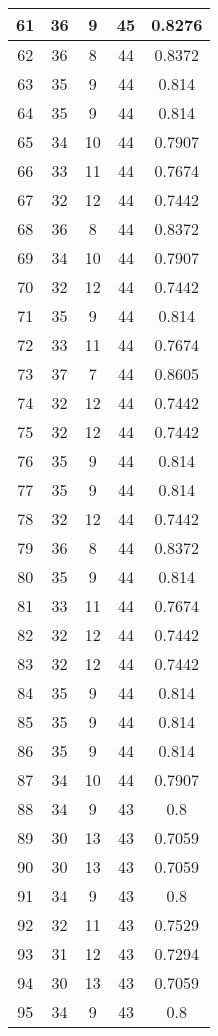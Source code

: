 \documentclass[letterpaper, 12pt]{article}
\begin{document}
\begin{longtable}{|c|c|c|c|c|}
\hline
61 & 36 & 9 & 45 & 0.8276 \\
\hline
62 & 36 & 8 & 44 & 0.8372 \\
\hline
63 & 35 & 9 & 44 & 0.814 \\
\hline
64 & 35 & 9 & 44 & 0.814 \\
\hline
65 & 34 & 10 & 44 & 0.7907 \\
\hline
66 & 33 & 11 & 44 & 0.7674 \\
\hline
67 & 32 & 12 & 44 & 0.7442 \\
\hline
68 & 36 & 8 & 44 & 0.8372 \\
\hline
69 & 34 & 10 & 44 & 0.7907 \\
\hline
70 & 32 & 12 & 44 & 0.7442 \\
\hline
71 & 35 & 9 & 44 & 0.814 \\
\hline
72 & 33 & 11 & 44 & 0.7674 \\
\hline
73 & 37 & 7 & 44 & 0.8605 \\
\hline
74 & 32 & 12 & 44 & 0.7442 \\
\hline
75 & 32 & 12 & 44 & 0.7442 \\
\hline
76 & 35 & 9 & 44 & 0.814 \\
\hline
77 & 35 & 9 & 44 & 0.814 \\
\hline
78 & 32 & 12 & 44 & 0.7442 \\
\hline
79 & 36 & 8 & 44 & 0.8372 \\
\hline
80 & 35 & 9 & 44 & 0.814 \\
\hline
81 & 33 & 11 & 44 & 0.7674 \\
\hline
82 & 32 & 12 & 44 & 0.7442 \\
\hline
83 & 32 & 12 & 44 & 0.7442 \\
\hline
84 & 35 & 9 & 44 & 0.814 \\
\hline
85 & 35 & 9 & 44 & 0.814 \\
\hline
86 & 35 & 9 & 44 & 0.814 \\
\hline
87 & 34 & 10 & 44 & 0.7907 \\
\hline
88 & 34 & 9 & 43 & 0.8 \\
\hline
89 & 30 & 13 & 43 & 0.7059 \\
\hline
90 & 30 & 13 & 43 & 0.7059 \\
\hline
91 & 34 & 9 & 43 & 0.8 \\
\hline
92 & 32 & 11 & 43 & 0.7529 \\
\hline
93 & 31 & 12 & 43 & 0.7294 \\
\hline
94 & 30 & 13 & 43 & 0.7059 \\
\hline
95 & 34 & 9 & 43 & 0.8 \\

\end{longtable}
\end{document}
